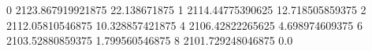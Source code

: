 0 2123.867919921875 22.138671875
1 2114.44775390625 12.718505859375
2 2112.05810546875 10.328857421875
4 2106.42822265625 4.698974609375
6 2103.52880859375 1.799560546875
8 2101.729248046875 0.0
